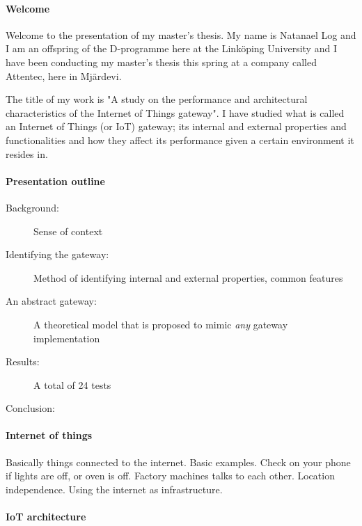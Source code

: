 \documentclass{memoir}
\begin{document}
\paragraph{Welcome}

Welcome to the presentation of my master's thesis. My name is Natanael Log and
I am an offspring of the D-programme here at the Linköping University and I
have been conducting my master's thesis this spring at a company called
Attentec, here in Mjärdevi.

The title of my work is "A study on the performance and architectural
characteristics of the Internet of Things gateway". I have studied what is
called an Internet of Things (or IoT) gateway; its internal and external
properties and functionalities and how they affect its performance given a
certain environment it resides in.

\paragraph{Presentation outline}

\begin{description}
    \item[Background:] Sense of context
    \item[Identifying the gateway:] Method of identifying internal and external
        properties, common features
    \item[An abstract gateway:] A theoretical model that is proposed to mimic
        \textit{any} gateway implementation
    \item[Results:] A total of 24 tests
    \item[Conclusion:]
\end{description}

\paragraph{Internet of things}

Basically things connected to the internet. Basic examples. Check on your phone
if lights are off, or oven is off. Factory machines talks to each other.
Location independence. Using the internet as infrastructure.


\paragraph{IoT architecture}
\end{document}
